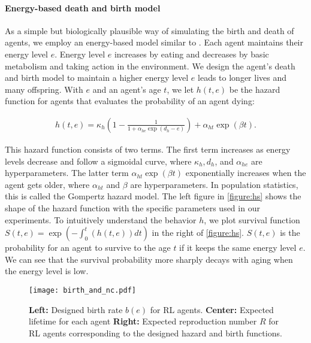 \paragraph{Energy-based death and birth model}
As a simple but biologically plausible way of simulating the birth and death of agents, we employ an energy-based model similar to \citet{hamonEcoevolutionaryDynamicsNonepisodic2023}. Each agent maintains their energy level $e$. Energy level $e$ increases by eating and decreases by basic metabolism and taking action in the environment. We design the agent's death and birth model to maintain a higher energy level $e$ leads to longer lives and many offspring. With $e$ and an agent's age $t$, we let $h(t, e)$ be the hazard function for agents that evaluates the probability of an agent dying:

\begin{align}
  h(t, e) = \kappa_{h} \left(1 - \frac{1}{1 + \alpha_{he} \exp(d_{h} - e)} \right) + \alpha_{ht} \exp(\beta t). \label{eq:h}
\end{align}

This hazard function\label{eq:h} consists of two terms. The first term increases as energy levels decrease and follow a sigmoidal curve, where $\kappa_{h}, d_{h}$, and $\alpha_{he}$ are hyperparameters. The latter term $\alpha_{ht} \exp(\beta t)$ exponentially increases when the agent gets older, where $\alpha_{ht}$ and $\beta$ are hyperparameters. In population statistics, this is called the Gompertz hazard model\citep{gompertzXXIVNatureFunction1825,kirkwoodDecipheringDeathCommentary2015}. The left figure in \cref{figure:hs} shows the shape of the hazard function with the specific parameters used in our experiments. To intuitively understand the behavior $h$, we plot survival function $S(t, e) = \exp (-\int_{0}^{t}(h(t, e)) dt)$ in the right of \cref{figure:hs}. $S(t, e)$ is the probability for an agent to survive to the age $t$ if it keeps the same energy level $e$. We can see that the survival probability more sharply decays with aging when the energy level is low.

\begin{figure}[t]
  \centering{}
  \texttt{[image: birth\_and\_nc.pdf]}
  \caption{
    \textbf{Left:} Designed birth rate $b(e)$ for RL agents.
    \textbf{Center:} Expected lifetime for each agent
    \textbf{Right:} Expected reproduction number $R$ for RL agents corresponding to the designed hazard and birth functions.
  }\label{figure:bnc}
\end{figure}

